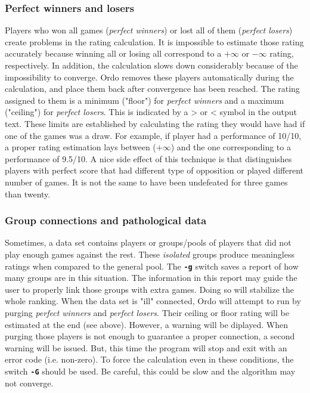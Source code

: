 \documentclass[12pt]{article}
\newcommand{\swtch} [1] {\texttt{\textbf{#1}}}
\begin{document}
\subsubsection*{Perfect winners and losers}

Players who won all games (\textit{perfect winners}) or lost all of them (\textit{perfect losers}) create problems in the rating calculation.
It is impossible to estimate those rating accurately because winning all or losing all correspond to a $+\infty$ or $-\infty$ rating, respectively.
In addition, the calculation slows down considerably because of the impossibility to converge.
Ordo removes these players automatically during the calculation, and place them back after convergence has been reached.
The rating assigned to them is a minimum ("floor") for \textit{perfect winners} and a maximum ("ceiling") for \textit{perfect losers}.
This is indicated by a > or < symbol in the output text.
These limits are established by calculating the rating they would have had if one of the games was a draw.
For example, if player had a performance of 10/10, a proper rating estimation lays between ($+\infty$) and the one corresponding to a performance of 9.5/10.
A nice side effect of this technique is that distinguishes players with perfect score that had different type of opposition or played different number of games.
It is not the same to have been undefeated for three games than twenty.

\subsubsection*{Group connections and pathological data}

Sometimes, a data set contains players or groups/pools of players that did not play enough games against the rest. 
These \textit{isolated} groups produce meaningless ratings when compared to the general pool. 
The \swtch{-g} switch saves a report of how many groups are in this situation.
The information in this report may guide the user to properly link those groups with extra games.
Doing so will stabilize the whole ranking.
When the data set is "ill" connected, Ordo will attempt to run by purging \textit{perfect winners} and \textit{perfect losers}.
Their ceiling or floor rating will be estimated at the end (see above). 
However, a warning will be diplayed.
When purging those players is not enough to guarantee a proper connection, a second warning will be issued.
But, this time the program will stop and exit with an error code (i.e. non-zero).
To force the calculation even in these conditions, the switch \swtch{-G} should be used.
Be careful, this could be slow and the algorithm may not converge.
 
\end{document}
